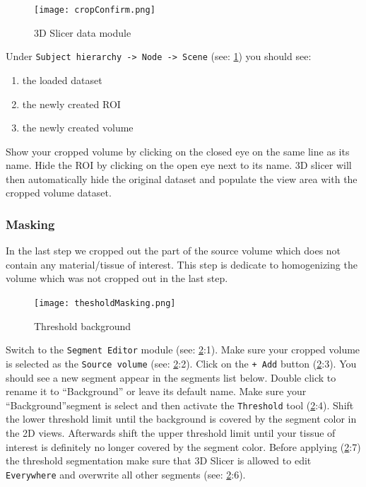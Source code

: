 \begin{figure}[h!]
	\centerline{
		\texttt{[image: cropConfirm.png]}}
	  \caption{3D Slicer data module}
	  \label{fig:cC}
	\end{figure}
	\pagebreak
	\newline
Under \texttt{Subject hierarchy -> Node -> Scene} (see: \cref{fig:cC}) you should see:
\begin{enumerate}
  \item the loaded dataset
  \item the newly created ROI
  \item the newly created volume
\end{enumerate}
Show your cropped volume by clicking on the closed eye on the same line as its name. Hide the ROI by clicking on the open eye next to its name.
3D slicer will then automatically hide the original dataset and populate the view area with the cropped volume dataset.

\subsubsection{Masking}\label{mask}
In the last step we cropped out the part of the source volume which does not contain any material/tissue of interest.
This step is dedicate to homogenizing the volume which was not cropped out in the last step.
\begin{figure}[h!]
	\centerline{
		\texttt{[image: thesholdMasking.png]}}
	  \caption{Threshold background}
	  \label{fig:tM}
\end{figure}
Switch to the \texttt{Segment Editor} module (see: \cref{fig:tM}:1).
Make sure your cropped volume is selected as the \texttt{Source volume} (see: \cref{fig:tM}:2).
Click on the \texttt{+ Add} button (\cref{fig:tM}:3). You should see a new segment appear in the segments list below.
Double click to rename it to ``Background'' or leave its default name.
Make sure your ``Background''segment is select and then activate the \texttt{Threshold} tool (\cref{fig:tM}:4).
Shift the lower threshold limit until the background is covered by the segment color in the 2D views. Afterwards shift the upper threshold limit until your tissue of interest is definitely no longer covered by the segment color.
Before applying (\cref{fig:tM}:7) the threshold segmentation make sure that 3D Slicer is allowed to edit \texttt{Everywhere} and overwrite all other segments (see: \cref{fig:tM}:6).

